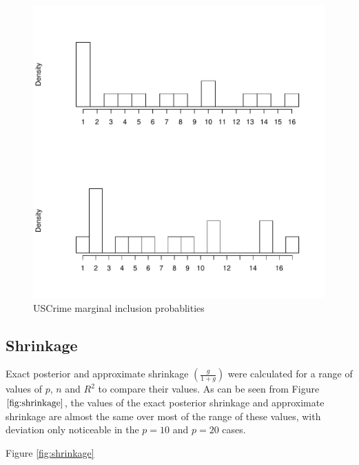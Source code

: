 \documentclass{amsart}[12pt]
\begin{document}
\begin{figure}[p]
\label{fig:USCrime_inclusion}
\caption{USCrime marginal inclusion probablities}
\includegraphics[scale=.4]{USCrime_histogram.pdf}
\end{figure}

\subsection{Shrinkage}

Exact posterior and approximate shrinkage $\left( \frac{g}{1 + g} \right)$ were calculated for a range of
values of $p$, $n$ and $R^2$ to compare their values. As can be seen from Figure $\ref{fig:shrinkage}$, the
values of the exact posterior shrinkage and approximate shrinkage are almost the same over most of the range
of these values, with deviation only noticeable in the $p=10$ and $p=20$ cases.

Figure \ref{fig:shrinkage}
\end{document}
